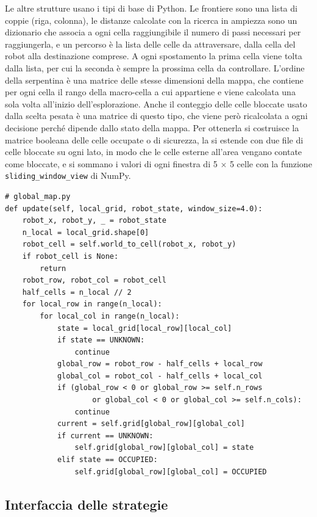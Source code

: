 Le altre strutture usano i tipi di base di Python. Le frontiere sono una lista di coppie (riga, colonna), le distanze calcolate con la ricerca in ampiezza sono un dizionario che associa a ogni cella raggiungibile il numero di passi necessari per raggiungerla, e un percorso è la lista delle celle da attraversare, dalla cella del robot alla destinazione comprese. A ogni spostamento la prima cella viene tolta dalla lista, per cui la seconda è sempre la prossima cella da controllare. L'ordine della serpentina è una matrice delle stesse dimensioni della mappa, che contiene per ogni cella il rango della macro-cella a cui appartiene e viene calcolata una sola volta all'inizio dell'esplorazione. Anche il conteggio delle celle bloccate usato dalla scelta pesata è una matrice di questo tipo, che viene però ricalcolata a ogni decisione perché dipende dallo stato della mappa. Per ottenerla si costruisce la matrice booleana delle celle occupate o di sicurezza, la si estende con due file di celle bloccate su ogni lato, in modo che le celle esterne all'area vengano contate come bloccate, e si sommano i valori di ogni finestra di 5 $\times$ 5 celle con la funzione \texttt{sliding\_window\_view} di NumPy.

\begin{lstlisting}[float=!htb, label=lst:fusione, caption={Fusione della griglia locale nella mappa globale.}]
# global_map.py
def update(self, local_grid, robot_state, window_size=4.0):
    robot_x, robot_y, _ = robot_state
    n_local = local_grid.shape[0]
    robot_cell = self.world_to_cell(robot_x, robot_y)
    if robot_cell is None:
        return
    robot_row, robot_col = robot_cell
    half_cells = n_local // 2
    for local_row in range(n_local):
        for local_col in range(n_local):
            state = local_grid[local_row][local_col]
            if state == UNKNOWN:
                continue
            global_row = robot_row - half_cells + local_row
            global_col = robot_col - half_cells + local_col
            if (global_row < 0 or global_row >= self.n_rows
                    or global_col < 0 or global_col >= self.n_cols):
                continue
            current = self.grid[global_row][global_col]
            if current == UNKNOWN:
                self.grid[global_row][global_col] = state
            elif state == OCCUPIED:
                self.grid[global_row][global_col] = OCCUPIED
\end{lstlisting}

\subsection{Interfaccia delle strategie}
\label{sec:interfaccia}

